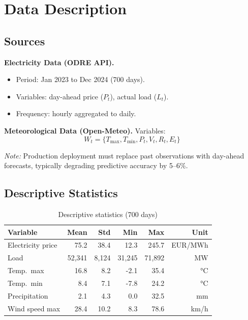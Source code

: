 \documentclass[11pt,a4paper]{article}
\begin{document}
\section{Data Description}

\subsection{Sources}

\textbf{Electricity Data (ODRE API).}
\begin{itemize}
    \item Period: Jan 2023 to Dec 2024 (700 days).
    \item Variables: day-ahead price ($P_t$), actual load ($L_t$).
    \item Frequency: hourly aggregated to daily.
\end{itemize}

\textbf{Meteorological Data (Open-Meteo).}
Variables:
\[
W_t = \{T_{\max}, T_{\min}, P_t, V_t, R_t, E_t\}
\]

\textit{Note:}  
Production deployment must replace past observations with day-ahead forecasts, typically degrading predictive accuracy by 5–6\%.

\subsection{Descriptive Statistics}

\begin{table}[H]
\centering
\caption{Descriptive statistics (700 days)}
\begin{tabular}{lrrrrr}
\toprule
Variable & Mean & Std & Min & Max & Unit \\
\midrule
Electricity price & 75.2 & 38.4 & 12.3 & 245.7 & EUR/MWh \\
Load & 52,341 & 8,124 & 31,245 & 71,892 & MW \\
Temp.\ max & 16.8 & 8.2 & -2.1 & 35.4 & °C \\
Temp.\ min & 8.4 & 7.1 & -7.8 & 24.2 & °C \\
Precipitation & 2.1 & 4.3 & 0.0 & 32.5 & mm \\
Wind speed max & 28.4 & 10.2 & 8.3 & 78.6 & km/h \\
\bottomrule
\end{tabular}
\end{table}
\end{document}
